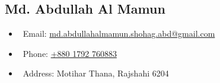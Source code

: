 \documentclass{article}
\begin{document}

\begin{adjustwidth}{-2cm}{-1.6cm}
    \begin{mdframed}[backgroundcolor=skyblue!20, frametitlebackgroundcolor=skyblue!20]
        \begin{adjustwidth}{1cm}{1cm}
            \section*{\hspace*{0.6cm}\fontsize{24}{24}\selectfont\textbf{Md. Abdullah Al Mamun}}
            \begin{itemize}
                \item[] \faEnvelope\ Email\hspace{0.4cm}: \href{mailto:md.abdullahalmamun.shohag.abd@gmail.com}{md.abdullahalmamun.shohag.abd@gmail.com}
                \item[] \faPhone\ Phone\hspace{0.35cm}: \href{tel:+8801792760883}{+880 1792 760883}
                \item[] \faMapMarker\ Address\hspace{0.17cm}: Motihar Thana, Rajshahi 6204
            \end{itemize}
        \end{adjustwidth}
    \end{mdframed}

\end{adjustwidth}
\end{document}
